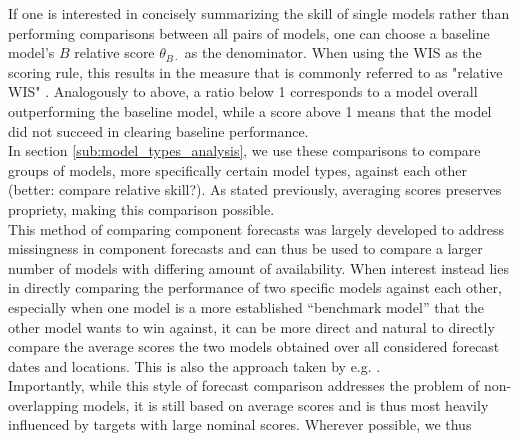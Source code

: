 If one is interested in concisely summarizing the skill of single models rather than performing comparisons between all pairs of models, one can choose a baseline model's $B$ relative score $\theta_{B\cdot}$ as the denominator. When using the WIS as the scoring rule, this results in the measure that is commonly referred to as "relative WIS" \citep{cramer_evaluation_2022}. Analogously to above, a ratio below 1 corresponds to a model overall outperforming the baseline model, while a score above 1 means that the model did not succeed in clearing baseline performance.\\
In section \ref{sub:model_types_analysis}, we use these comparisons to compare groups of models, more specifically certain model types, against each other (better: compare relative skill?). As stated previously, averaging scores preserves propriety, making this comparison possible.\\
This method of comparing component forecasts was largely developed to address missingness in component forecasts and can thus be used to compare a larger number of models with differing amount of availability. When interest instead lies in directly comparing the performance of two specific models against each other, especially when one model is a more established ``benchmark model'' that the other model wants to win against, it can be more direct and natural to directly compare the average scores the two models obtained over all considered forecast dates and locations. This is also the approach taken by e.g. \cite{bosse_comparing_2021-1}.\\
Importantly, while this style of forecast comparison addresses the problem of non-overlapping models, it is still based on average scores and is thus most heavily influenced by targets with large nominal scores. Wherever possible, we thus 
